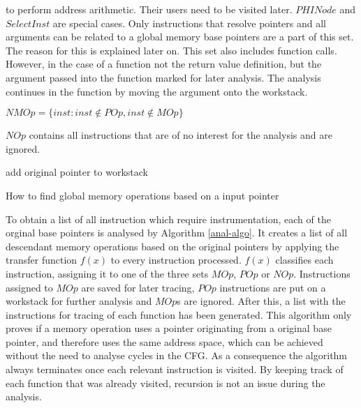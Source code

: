 to perform address arithmetic. Their users need to be visited later. 
$PHINode$ and $SelectInst$ are special cases. Only instructions that resolve pointers and all arguments can be related to a global memory base pointers are a part of this set. The reason for
this is explained later on.
This set also includes function calls. However, in the case of a function not the return value definition, but the argument passed into the function marked for later analysis. The analysis continues in the function by moving the argument
onto the workstack.
\begin{defi}\label{nmop}
	$	NMOp = \{inst : inst \notin POp, inst \notin MOp\}$
\end{defi}
$NOp$ contains all instructions that are of no interest for the analysis and are ignored.
\begin{algorithm}[t]
	add original pointer to workstack\;
\caption{How to find global memory operations based on a input pointer}
\label{anal-algo}
\end{algorithm}

To obtain a list of all instruction which require instrumentation, each of the orginal base pointers is analysed by Algorithm \ref{anal-algo}. It creates a list of all descendant memory operations based on the original  pointers by applying the transfer function $f(x)$ to every instruction processed. $f(x)$ classifies each instruction, assigning it to one of the three sets $MOp$, $POp$ or $NOp$. Instructions assigned to $MOp$ are saved for later tracing, $POp$ instructions are put on a workstack for further analysis and $MOp$s are ignored. After this, a list with the instructions for tracing of each function has been generated. This algorithm only proves if a memory operation uses a pointer originating from a original base pointer, and therefore uses the same address space, which can be achieved without the need to analyse cycles in the CFG. As a consequence the algorithm always terminates once each relevant instruction is visited. By keeping track of each function that was already visited, recursion is not an issue during the analysis.



